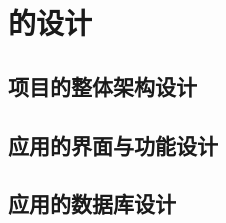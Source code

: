 \chapter{\app 的设计}\label{ch:design}


\section{项目的整体架构设计}\label{sec:arch-design}



\section{应用的界面与功能设计}\label{sec:app-design}



\section{应用的数据库设计}\label{sec:db-design}

